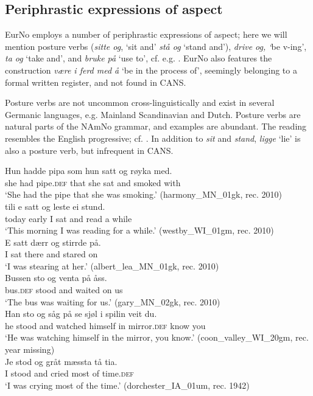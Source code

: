 \documentclass[output=paper]{langscibook}
\begin{document}
\subsection{Periphrastic expressions of aspect}
\label{bkm:Ref159266133}\label{sec:eide:4.2}
EurNo employs a number of periphrastic expressions of aspect; here we will mention posture verbs (\textit{sitte og}, ‘sit and’ \textit{stå og} ‘stand and’), \textit{drive og, ‘}be v-ing’, \textit{ta og} ‘take and’, and \textit{bruke på} ‘use to’, cf. e.g. \citet{Tonne2007}. EurNo also features the construction \textit{være i ferd med å} ‘be in the process of’, seemingly belonging to a formal written register, and not found in CANS. 

  Posture verbs are not uncommon cross-linguistically and exist in several Germanic languages, e.g. Mainland Scandinavian and Dutch. Posture verbs are natural parts of the NAmNo grammar, and examples are abundant. The reading resembles the English progressive; cf. . In addition to \textit{sit} and \textit{stand}, \textit{ligge} `lie' is also a posture verb, but infrequent in CANS. 

\ea%
    \label{ex:eide:18}
    \ea 
    \gll     Hun hadde pipa som hun satt og røyka med.    \\
             she had pipe.\textsc{def} that she sat and smoked with    \\
    \glt     ‘She had the pipe that she was smoking.’  (harmony\_MN\_01gk, rec. 2010)\\
    \ex   
     tili e satt og leste ei stund.     \\
         today early I sat and read a while      \\
    \glt ‘This morning I was reading for a while.’ (westby\_WI\_01gm, rec. 2010)\\
    \ex  
    \gll E satt dærr og stirrde på.        \\
          I sat there and stared on         \\
    \glt  ‘I was stearing at her.’ (albert\_lea\_MN\_01gk, rec. 2010)\\
    \ex 
    \gll Bussen sto og venta på åss.   \\
         bus.\textsc{def} stood and waited on us\\
    \glt ‘The bus was waiting for us.’ (gary\_MN\_02gk, rec. 2010)\\
    \ex  
    \gll Han sto og {såg på} {se sjøl} i spilin veit du.    \\
          he stood and watched himself in mirror.\textsc{def} know you \\
    \glt  ‘He was watching himself in the mirror, you know.’  (coon\_valley\_WI\_20gm, rec. year missing)\\
    \ex   
    \gll   Je stod og gråt mæssta tå tia.   \\
          I stood and cried most of time.\textsc{def}\\
    \glt  ‘I was crying most of the time.’ (dorchester\_IA\_01um, rec. 1942)\\
    \z %
\z
\end{document}
